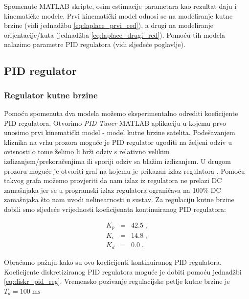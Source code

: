 \documentclass[times, utf8, diplomski, numeric]{templates/template}
\begin{document}
{{{            Spomenute MATLAB skripte, osim estimacije parametara kao rezultat daju i kinematičke modele. Prvi kinematički model odnosi se na modeliranje kutne brzine (vidi jednadžbu \ref{eq:laplace_prvi_red}), a drugi na modeliranje orijentacije/kuta (jednadžba \ref{eq:laplace_drugi_red}). Pomoću tih modela nalazimo parametre PID regulatora (vidi sljedeće poglavlje).
        }

        \subsection{PID regulator}{
        \label{subsection:pid_regulator}

            \subsubsection{Regulator kutne brzine}{
                Pomoću spomenuta dva modela možemo eksperimentalno odrediti koeficijente PID regulatora. Otvorimo \emph{PID Tuner} MATLAB aplikaciju \cite{pid_tuner} u kojemu prvo unosimo prvi kinematički model - model kutne brzine satelita. Podešavanjem kliznika na vrhu prozora moguće je PID regulator ugoditi na željeni odziv u ovisnosti o tome želimo li brži odziv s relativno velikim izdizanjem/prekoračenjima  ili sporiji odziv sa blažim izdizanjem. U drugom prozoru moguće je otvoriti graf na kojemu je prikazan izlaz regulatora . Pomoću takvog grafa možemo provjeriti da nam izlaz iz regulatora ne prelazi DC zamašnjaka jer se u programski izlaz regulatora ograničava na 100\% DC zamašnjaka što nam uvodi nelinearnosti u sustav. Za regulaciju kutne brzine dobili smo sljedeće vrijednosti koeficijenata kontinuiranog PID regulatora:

                \begin{equation}
                \begin{array}{rcl}
                    K_p & = & 42.5 \; , \\
                    K_i & = & 14.8 \; , \\
                    K_d & = &  0.0 \; .
                \end{array}
                \end{equation}

                Obraćamo pažnju kako su ovo koeficijenti kontinuiranog PID regulatora. Koeficijente diskretiziranog PID regulatora moguće je dobiti pomoću jednadžbi \ref{eq:diskr_pid_reg}. Vremensko pozivanje regulacijske petlje kutne brzine je $T_d = 100 \; \text{ms}$
            }

}}}
\end{document}
